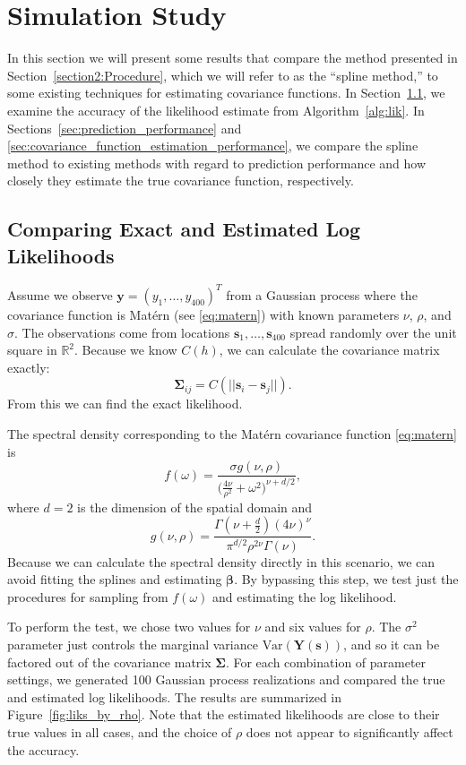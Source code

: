 \documentclass[12pt]{article}
\begin{document}

\section{Simulation Study}
\label{section3:Simulation-Study}

In this section we will present some results that compare the method presented in Section~\ref{section2:Procedure}, which we will refer to as the ``spline method,'' to some existing techniques for estimating covariance functions. In Section~\ref{sec:comparing_exact_and_estimated_log_likelihoods}, we examine the accuracy of the likelihood estimate from Algorithm~\ref{alg:lik}. In Sections~\ref{sec:prediction_performance} and \ref{sec:covariance_function_estimation_performance}, we compare the spline method to existing methods with regard to prediction performance and how closely they estimate the true covariance function, respectively.

\subsection{Comparing Exact and Estimated Log Likelihoods} %
\label{sec:comparing_exact_and_estimated_log_likelihoods}

Assume we observe $\bm{y} = (y_1, \dots, y_{400})^T$ from a Gaussian process where the covariance function is Mat\'{e}rn (see \eqref{eq:matern}) with known parameters $\nu$, $\rho$, and $\sigma$. The observations come from locations $\bm{s}_1, \dots, \bm{s}_{400}$ spread randomly over the unit square in $\mathbb{R}^2$. Because we know $C(h)$, we can calculate the covariance matrix exactly:
\[
  \bm{\Sigma}_{ij} = C(||\bm{s}_i - \bm{s}_j||).
\]
From this we can find the exact likelihood.

The spectral density corresponding to the Mat\'{e}rn covariance function \eqref{eq:matern} is
\[
  f(\omega) = \frac{\sigma g(\nu, \rho)}{\big( \frac{4\nu}{\rho^2} + \omega^2 \big)^{\nu+d/2}},
\]
where $d = 2$ is the dimension of the spatial domain and
\[
  g(\nu, \rho) = \frac{\Gamma\left(\nu + \frac{d}{2}\right)(4\nu)^\nu}{\pi^{d/2} \rho^{2\nu} \Gamma(\nu)}.
\]
Because we can calculate the spectral density directly in this scenario, we can avoid fitting the splines and estimating $\bm{\beta}$. By bypassing this step, we test just the procedures for sampling from $f(\omega)$ and estimating the log likelihood.

To perform the test, we chose two values for $\nu$ and six values for $\rho$. The $\sigma^2$ parameter just controls the marginal variance $\textrm{Var}(\bm{Y}(\bm{s}))$, and so it can be factored out of the covariance matrix $\bm{\Sigma}$. For each combination of parameter settings, we generated 100 Gaussian process realizations and compared the true and estimated log likelihoods. The results are summarized in Figure~\ref{fig:liks_by_rho}. Note that the estimated likelihoods are close to their true values in all cases, and the choice of $\rho$ does not appear to significantly affect the accuracy.
\end{document}
